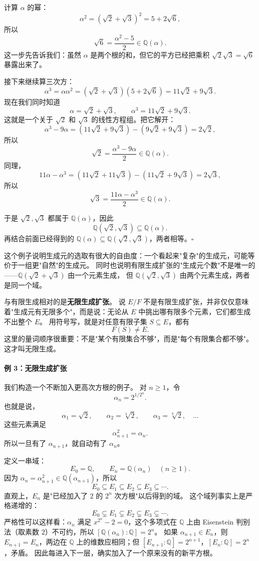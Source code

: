计算 $\alpha$ 的幂：
\[
\alpha^2=(\sqrt{2}+\sqrt{3})^2=5+2\sqrt{6},
\]
所以
\[
\sqrt{6}=\frac{\alpha^2-5}{2}\in\mathbb{Q}(\alpha).
\]
这一步先告诉我们：虽然 $\alpha$ 是两个根的和，但它的平方已经把乘积 $\sqrt{2}\sqrt{3}=\sqrt{6}$ 暴露出来了。

接下来继续算三次方：
\[
\alpha^3=\alpha\alpha^2=(\sqrt{2}+\sqrt{3})(5+2\sqrt{6})
=11\sqrt{2}+9\sqrt{3}.
\]
现在我们同时知道
\[
\alpha=\sqrt{2}+\sqrt{3},\qquad
\alpha^3=11\sqrt{2}+9\sqrt{3}.
\]
这就是一个关于 $\sqrt{2}$ 和 $\sqrt{3}$ 的线性方程组。把它解开：
\[
\alpha^3-9\alpha
=(11\sqrt{2}+9\sqrt{3})-(9\sqrt{2}+9\sqrt{3})
=2\sqrt{2},
\]
所以
\[
\sqrt{2}=\frac{\alpha^3-9\alpha}{2}\in\mathbb{Q}(\alpha).
\]
同理，
\[
11\alpha-\alpha^3
=(11\sqrt{2}+11\sqrt{3})-(11\sqrt{2}+9\sqrt{3})
=2\sqrt{3},
\]
所以
\[
\sqrt{3}=\frac{11\alpha-\alpha^3}{2}\in\mathbb{Q}(\alpha).
\]

于是 $\sqrt{2},\sqrt{3}$ 都属于 $\mathbb{Q}(\alpha)$，因此
\[
\mathbb{Q}(\sqrt{2},\sqrt{3})\subseteq \mathbb{Q}(\alpha).
\]
再结合前面已经得到的 $\mathbb{Q}(\alpha)\subseteq \mathbb{Q}(\sqrt{2},\sqrt{3})$，两者相等。$\square$

这个例子说明生成元的选取有很大的自由度：一个看起来"复杂"的生成元，可能等价于一组更"自然"的生成元。
同时也说明有限生成扩张的"生成元个数"不是唯一的——$\mathbb{Q}(\sqrt{2}+\sqrt{3})$ 由一个元素生成，
但 $\mathbb{Q}(\sqrt{2}, \sqrt{3})$ 由两个元素生成，两者是同一个域。

与有限生成相对的是\textbf{无限生成扩张}。
说 $E/F$ 不是有限生成扩张，并非仅仅意味着"生成元有无限多个"，而是说：无论从 $E$ 中挑出哪有限多个元素，它们都生成不出整个 $E$。
用符号写，就是对任意有限子集 $S\subseteq E$，都有
\[
F(S)\neq E.
\]
这里的量词顺序很重要：不是"某个有限集合不够"，而是"每个有限集合都不够"。
这才叫无限生成。

\paragraph*{例 3：无限生成扩张}
我们构造一个不断加入更高次方根的例子。
对 $n\geq 1$，令
\[
\alpha_n=2^{1/2^n}.
\]
也就是说，
\[
\alpha_1=\sqrt{2},\qquad
\alpha_2=\sqrt[4]{2},\qquad
\alpha_3=\sqrt[8]{2},\quad \ldots
\]
这些元素满足
\[
\alpha_{n+1}^2=\alpha_n.
\]
所以一旦有了 $\alpha_{n+1}$，就自动有了 $\alpha_n$。

定义一串域：
\[
E_0=\mathbb{Q},\qquad
E_n=\mathbb{Q}(\alpha_n)\quad (n\geq 1).
\]
因为 $\alpha_n=\alpha_{n+1}^2\in \mathbb{Q}(\alpha_{n+1})$，所以
\[
E_0\subseteq E_1\subseteq E_2\subseteq E_3\subseteq \cdots.
\]
直观上，$E_n$ 是"已经加入了 $2$ 的 $2^n$ 次方根"以后得到的域。
这个域列事实上是严格递增的：
\[
E_0\subsetneq E_1\subsetneq E_2\subsetneq E_3\subsetneq \cdots.
\]
严格性可以这样看：$\alpha_n$ 满足 $x^{2^n}-2=0$，这个多项式在 $\mathbb{Q}$ 上由 Eisenstein 判别法（取素数 $2$）不可约，所以 $[\mathbb{Q}(\alpha_n):\mathbb{Q}]=2^n$。
如果 $\alpha_{n+1}\in E_n$，则 $E_{n+1}=E_n$，两边在 $\mathbb{Q}$ 上的维数应相同；但 $[E_{n+1}:\mathbb{Q}]=2^{n+1}$，$[E_n:\mathbb{Q}]=2^n$，矛盾。
因此每进入下一层，确实加入了一个原来没有的新平方根。

